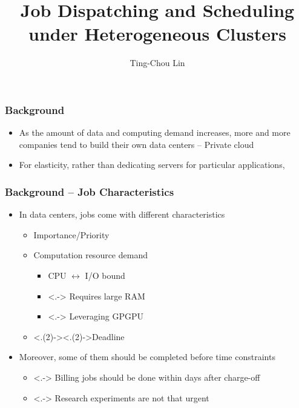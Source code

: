 \documentclass{beamer}
\title{Job Dispatching and Scheduling under Heterogeneous Clusters}
\author{Ting-Chou Lin}
\begin{document}
\begin{frame}
  \titlepage
  \label{title-page}
\end{frame}
\begin{frame}
  \frametitle{Background}
  \begin{itemize}[<+->]
    \item As the amount of data and computing demand increases, more and
      more companies tend to build their own data centers -- Private cloud
    \item For elasticity, rather than dedicating servers for particular
      applications, %
  \end{itemize}
\end{frame}
\begin{frame}
  \frametitle{Background -- Job Characteristics}
  \begin{itemize}[<+->]
    \item In data centers, jobs come with different characteristics
      \begin{itemize}
        \item Importance/Priority
        \item Computation resource demand
          \begin{itemize}
            \item CPU $\leftrightarrow$ I/O bound
            \item <.-> Requires large RAM
            \item <.-> Leveraging GPGPU
          \end{itemize}
        \item <.(2)->{\alert<.(2)->{Deadline}}
      \end{itemize}
    \item Moreover, some of them should be completed before time
      constraints
      \begin{itemize}
        \item <.-> Billing jobs should be done within days after charge-off
        \item <.-> Research experiments are not that urgent
      \end{itemize}
  \end{itemize}
\end{frame}
\end{document}
